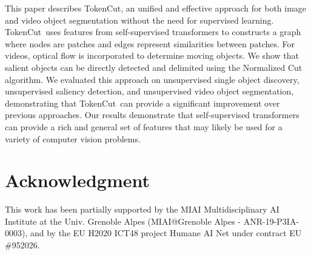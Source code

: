 \documentclass[twocolumn]{article}
\newcommand{\name} {TokenCut}
\begin{document}
This paper describes {\name}, an unified and effective approach for both image and video object segmentation without the need for supervised learning. \name~uses features from self-supervised transformers to constructs a graph where nodes are patches and edges represent similarities between patches. For videos, optical flow is incorporated to determine moving objects. We  show that salient objects can be directly detected and delimited using the Normalized Cut algorithm. We evaluated this approach on unsupervised single object discovery, unsupervised saliency detection, and unsupervised video object segmentation, demonstrating that  \name~can provide a significant improvement over previous approaches. Our results demonstrate that self-supervised transformers can provide a rich and general set of features that may likely be used for a variety of computer vision problems.  































\section*{Acknowledgment}


This work has been partially supported by the  MIAI  Multidisciplinary AI Institute at the Univ. Grenoble Alpes (MIAI@Grenoble Alpes - ANR-19-P3IA-0003),  and by the EU H2020 ICT48 project Humane AI Net under contract EU \#952026.





\end{document}
